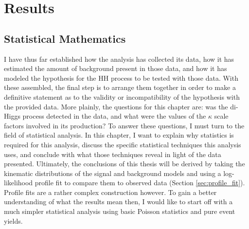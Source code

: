 \chapter{Results} \label{chapter:results}


\section{Statistical Mathematics}

    I have thus far established how the analysis has collected its data,
        how it has estimated the amount of background present in those data,
        and how it has modeled the hypothesis for the HH process to be tested with those data.
    With these assembled, the final step is to arrange them together in order to make a definitive statement
        as to the validity or incompatibility of the hypothesis with the provided data.
    More plainly, the questions for this chapter are:
        was the di-Higgs process detected in the data,
        and what were the values of the $\kappa$ scale factors involved in its production?
    To answer these questions, I must turn to the field of statistical analysis.
    In this chapter, I want to explain why statistics is required for this analysis,
        discuss the specific statistical techniques this analysis uses,
        and conclude with what those techniques reveal in light of the data presented.
    Ultimately, the conclusions of this thesis will be derived by
        taking the kinematic distributions of the signal and background models and 
        using a log-likelihood profile fit to compare them to observed data (Section \ref{sec:profile_fit}).
    Profile fits are a rather complex construction however.
    To gain a better understanding of what the results mean then,
        I would like to start off with a much simpler statistical analysis
        using basic Poisson statistics and pure event yields.

